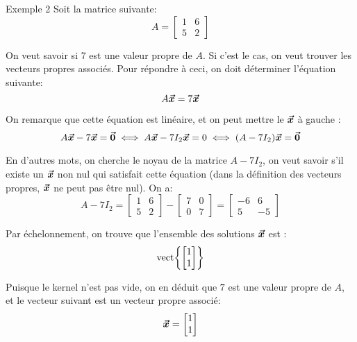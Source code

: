 \documentclass[a4paper]{article}
\begin{document}
\begin{parag}{Exemple 2}
    Soit la matrice suivante: 
    \[A = \begin{bmatrix} 1 & 6 \\ 5 & 2 \end{bmatrix} \]
    
    On veut savoir si 7 est une valeur propre de $A$. Si c'est le cas, on veut trouver les vecteurs propres associés. Pour répondre à ceci, on doit déterminer l'équation suivante: 
    \[A \bm{\protect\vec{x}} = 7\bm{\protect\vec{x}}\]

    On remarque que cette équation est linéaire, et on peut mettre le $\bm{\protect\vec{x}}$ à gauche : 
    \[A \bvec{x} - 7\bvec{x} = \bvec{0} \iff A \bvec{x} - 7I_2\bvec{x} = 0 \iff \left(A - 7I_2\right)\bvec{x} = \bvec{0}\]
    
    En d'autres mots, on cherche le noyau de la matrice $A - 7I_2$, on veut savoir s'il existe un $\bm{\protect\vec{x}}$ non nul qui satisfait cette équation (dans la définition des vecteurs propres, $\bm{\protect\vec{x}}$ ne peut pas être nul). On a: 
    \[A - 7I_2 = \begin{bmatrix} 1 & 6 \\ 5 & 2 \end{bmatrix} - \begin{bmatrix} 7 & 0 \\ 0 & 7 \end{bmatrix} = \begin{bmatrix} -6 & 6 \\ 5 & -5 \end{bmatrix} \]
    
    Par échelonnement, on trouve que l'ensemble des solutions $\bm{\protect\vec{x}}$ est :
    \[\vect\left\{\begin{bmatrix} 1 \\ 1 \end{bmatrix} \right\}\]
    
    Puisque le kernel n'est pas vide, on en déduit que $7$ est une valeur propre de $A$, et le vecteur suivant est un vecteur propre associé: 
    \[\bm{\protect\vec{x}} = \begin{bmatrix} 1 \\ 1 \end{bmatrix}\]
\end{parag}
\end{document}
